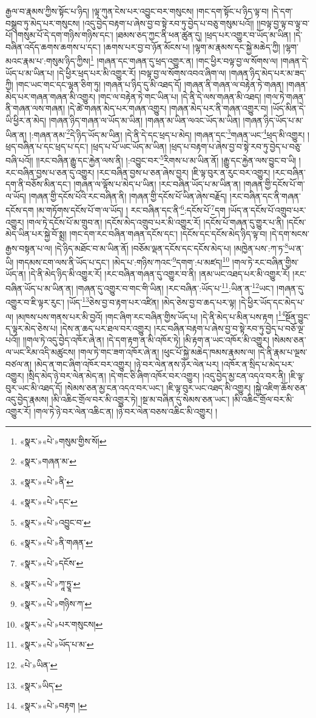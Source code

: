 རྒྱལ་བ་རྣམས་ཀྱིས་སྟོང་པ་ཉིད། །ལྟ་ཀུན་ངེས་པར་འབྱུང་བར་གསུངས། །གང་དག་སྟོང་པ་ཉིད་ལྟ་བ། །དེ་དག་བསྒྲུབ་ཏུ་མེད་པར་གསུངས། །འདུ་བྱེད་བརྟག་པ་ཞེས་བྱ་བ་སྟེ་རབ་ཏུ་བྱེད་པ་བཅུ་གསུམ་པའོ།། །།བལྟ་བྱ་ལྟ་བ་ལྟ་བ་པོ། །གསུམ་པོ་དེ་དག་གཉིས་གཉིས་དང་། །ཐམས་ཅད་ཀྱང་ནི་ཕན་ཚུན་དུ། །ཕྲད་པར་འགྱུར་བ་ཡོད་མ་ཡིན། །དེ་བཞིན་འདོད་ཆགས་ཆགས་པ་དང་། །ཆགས་པར་བྱ་བ་ཉོན་མོངས་པ། །ལྷག་མ་རྣམས་དང་སྐྱེ་མཆེད་ཀྱི། །ལྷག་མའང་རྣམ་པ་:གསུམ་ཉིད་ཀྱིས།\footnote{«སྣར་»«པེ་»གསུམ་གྱིས་སོ།} །གཞན་དང་གཞན་དུ་ཕྲད་འགྱུར་ན། །གང་ཕྱིར་བལྟ་བྱ་ལ་སོགས་ལ། །གཞན་དེ་ཡོད་པ་མ་ཡིན་པ། །དེ་ཕྱིར་ཕྲད་པར་མི་འགྱུར་རོ། །བལྟ་བྱ་ལ་སོགས་འབའ་ཞིག་ལ། །གཞན་ཉིད་མེད་པར་མ་ཟད་ཀྱི། །གང་ཡང་གང་དང་ལྷན་ཅིག་ཏུ། །གཞན་པ་ཉིད་དུ་མི་འཐད་དོ། །གཞན་ནི་གཞན་ལ་བརྟེན་ཏེ་གཞན། །གཞན་མེད་པར་གཞན་གཞན་མི་འགྱུར། །གང་ལ་བརྟེན་ཏེ་གང་ཡིན་པ། །དེ་ནི་དེ་ལས་གཞན་མི་འཐད། །གལ་ཏེ་གཞན་ནི་གཞན་ལས་གཞན། །དེ་ཚེ་གཞན་མེད་པར་གཞན་འགྱུར། །གཞན་མེད་པར་ནི་གཞན་འགྱུར་བ། །ཡོད་མིན་དེ་ཡི་ཕྱིར་ན་མེད། །གཞན་ཉིད་གཞན་ལ་ཡོད་མ་ཡིན། །གཞན་མ་ཡིན་ལའང་ཡོད་མ་ཡིན། །གཞན་ཉིད་ཡོད་པ་མ་ཡིན་ན། །:གཞན་ནམ་\footnote{«སྣར་»གཞན་མ་}དེ་ཉིད་ཡོད་མ་ཡིན། །དེ་ནི་དེ་དང་ཕྲད་པ་མེད། །གཞན་དང་\footnote{«སྣར་»«པེ་»ནི་}གཞན་ཡང་\footnote{«སྣར་»«པེ་»དང་}ཕྲད་མི་འགྱུར། །ཕྲད་བཞིན་པ་དང་ཕྲད་པ་དང་། །ཕྲད་པ་པོ་ཡང་ཡོད་མ་ཡིན། །ཕྲད་པ་བརྟག་པ་ཞེས་བྱ་བ་སྟེ་རབ་ཏུ་བྱེད་པ་བཅུ་བཞི་པའོ།། །།རང་བཞིན་རྒྱུ་དང་རྐྱེན་ལས་ནི། །:འབྱུང་བར་\footnote{«སྣར་»«པེ་»འབྱུང་བ་}རིགས་པ་མ་ཡིན་ནོ། །རྒྱུ་དང་རྐྱེན་ལས་བྱུང་བ་ཡི། །རང་བཞིན་བྱས་པ་ཅན་དུ་འགྱུར། །རང་བཞིན་བྱས་པ་ཅན་ཞེས་བྱར། །ཇི་ལྟ་བུར་ན་རུང་བར་འགྱུར། །རང་བཞིན་དག་ནི་བཅོས་མིན་དང་། །གཞན་ལ་ལྟོས་པ་མེད་པ་ཡིན། །རང་བཞིན་ཡོད་པ་མ་ཡིན་ན། །གཞན་གྱི་དངོས་པོ་ག་ལ་ཡོད། །གཞན་གྱི་དངོས་པོའི་རང་བཞིན་ནི། །གཞན་གྱི་དངོས་པོ་ཡིན་ཞེས་བརྗོད། །རང་བཞིན་དང་ནི་གཞན་དངོས་དག །མ་གཏོགས་དངོས་པོ་ག་ལ་ཡོད། །
རང་བཞིན་དང་ནི་\footnote{«སྣར་»«པེ་»ནི་གཞན་}:དངོས་པོ་\footnote{«སྣར་»«པེ་»དངོས་}དག །ཡོད་ན་དངོས་པོ་འགྲུབ་པར་འགྱུར། །གལ་ཏེ་དངོས་པོ་མ་གྲུབ་ན། །དངོས་མེད་འགྲུབ་པར་མི་འགྱུར་རོ། །དངོས་པོ་གཞན་དུ་གྱུར་པ་ནི། །དངོས་མེད་ཡིན་པར་སྐྱེ་བོ་སྨྲ། །གང་དག་རང་བཞིན་གཞན་དངོས་དང་། །དངོས་དང་དངོས་མེད་ཉིད་ལྟ་བ། །དེ་དག་སངས་རྒྱས་བསྟན་པ་ལ། །དེ་ཉིད་མཐོང་བ་མ་ཡིན་ནོ། །བཅོམ་ལྡན་དངོས་དང་དངོས་མེད་པ། །མཁྱེན་པས་:ཀ་ཏ་\footnote{«སྣར་»«པེ་»ཀཱ་ཏྱཱ་}ཡ་ན་ཡི། །གདམས་ངག་ལས་ནི་ཡོད་པ་དང་། །མེད་པ་:གཉིས་ཀའང་\footnote{«སྣར་»«པེ་»གཉིས་ཀ་}དགག་:པ་མཛད།\footnote{«སྣར་»«པེ་»པར་གསུངས།} །གལ་ཏེ་རང་བཞིན་གྱིས་ཡོད་ན། །དེ་ནི་མེད་ཉིད་མི་འགྱུར་རོ། །རང་བཞིན་གཞན་དུ་འགྱུར་བ་ནི། །ནམ་ཡང་འཐད་པར་མི་འགྱུར་རོ། །རང་བཞིན་ཡོད་པ་མ་ཡིན་ན། །གཞན་དུ་འགྱུར་བ་གང་གི་ཡིན། །རང་བཞིན་:ཡོད་པ་\footnote{«སྣར་»«པེ་»ཡོད་པ་མ་}:ཡིན་ན་\footnote{«པེ་»ཡིན་}ཡང་། །གཞན་དུ་འགྱུར་བ་ཇི་ལྟར་རུང་། །ཡོད་\footnote{«སྣར་»ཡིད་}ཅེས་བྱ་བ་རྟག་པར་འཛིན། །མེད་ཅེས་བྱ་བ་ཆད་པར་ལྟ། །དེ་ཕྱིར་ཡོད་དང་མེད་པ་ལ། །མཁས་པས་གནས་པར་མི་བྱའོ། །གང་ཞིག་རང་བཞིན་གྱིས་ཡོད་པ། །དེ་ནི་མེད་པ་མིན་པས་རྟག །\footnote{«སྣར་»«པེ་»བརྟག །}སྔོན་བྱུང་ད་ལྟར་མེད་ཅེས་པ། །དེས་ན་ཆད་པར་ཐལ་བར་འགྱུར། །རང་བཞིན་བརྟག་པ་ཞེས་བྱ་བ་སྟེ་རབ་ཏུ་བྱེད་པ་བཅོ་ལྔ་པའོ།། །།གལ་ཏེ་འདུ་བྱེད་འཁོར་ཞེ་ན། །དེ་དག་རྟག་ན་མི་འཁོར་ཏེ། །མི་རྟག་ན་ཡང་འཁོར་མི་འགྱུར། །སེམས་ཅན་ལ་ཡང་རིམ་འདི་མཚུངས། །གལ་ཏེ་གང་ཟག་འཁོར་ཞེ་ན། །ཕུང་པོ་སྐྱེ་མཆེད་ཁམས་རྣམས་ལ། །དེ་ནི་རྣམ་པ་ལྔས་བཙལ་ན། །མེད་ན་གང་ཞིག་འཁོར་བར་འགྱུར། །ཉེ་བར་ལེན་ནས་ཉེར་ལེན་པར། །འཁོར་ན་སྲིད་པ་མེད་པར་འགྱུར། །སྲིད་མེད་ཉེ་བར་ལེན་མེད་ན། །དེ་གང་ཅི་ཞིག་འཁོར་བར་འགྱུར། །འདུ་བྱེད་མྱ་ངན་འདའ་བར་ནི། །ཇི་ལྟ་བུར་ཡང་མི་འཐད་དོ། །སེམས་ཅན་མྱ་ངན་འདའ་བར་ཡང་། །ཇི་ལྟ་བུར་ཡང་འཐད་མི་འགྱུར། །སྐྱེ་འཇིག་ཆོས་ཅན་འདུ་བྱེད་རྣམས། །མི་འཆིང་གྲོལ་བར་མི་འགྱུར་ཏེ། །སྔ་མ་བཞིན་དུ་སེམས་ཅན་ཡང་། །མི་འཆིང་གྲོལ་བར་མི་འགྱུར་རོ། །གལ་ཏེ་ཉེ་བར་ལེན་འཆིང་ན། །ཉེ་བར་ལེན་བཅས་འཆིང་མི་འགྱུར། །
